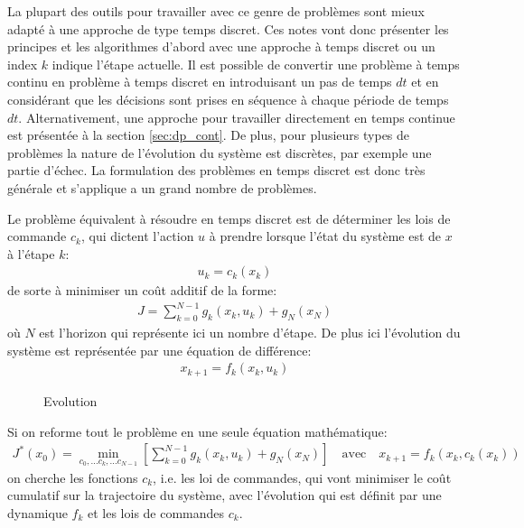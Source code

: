 La plupart des outils pour travailler avec ce genre de problèmes sont mieux adapté à une approche de type temps discret. Ces notes vont donc présenter les principes et les algorithmes d'abord avec une approche à temps discret ou un index $k$ indique l'étape actuelle. Il est possible de convertir une problème à temps continu en problème à temps discret en introduisant un pas de temps $dt$ et en considérant que les décisions sont prises en séquence à chaque période de temps $dt$. Alternativement, une approche pour travailler directement en temps continue est présentée à la section \ref{sec:dp_cont}. De plus, pour plusieurs types de problèmes la nature de l'évolution du système est discrètes, par exemple une partie d'échec. La formulation des problèmes en temps discret est donc très générale et s'applique a un grand nombre de problèmes.

Le problème équivalent à résoudre en temps discret est de déterminer les lois de commande $c_k$, qui dictent l'action $u$ à prendre lorsque l'état du système est de $x$ à l'étape $k$:
\begin{align}
u_k = c_k( x_k )
\end{align}
de sorte à minimiser un coût additif de la forme:
\begin{align}
    J = \sum_{k=0}^{N-1} g_k(x_k, u_k) + g_N( x_N )
\end{align}
où $N$ est l'horizon qui représente ici un nombre d'étape. De plus ici l'évolution du système est représentée par une équation de différence:
\begin{align}
    x_{k+1} = f_k( x_k, u_k)
\end{align}

\begin{figure}[H]
	\centering
	\vspace{-10pt}
		\caption{Evolution}
		\label{fig:evolution}
\end{figure}

Si on reforme tout le problème en une seule équation mathématique:
\begin{align}
    J^*(x_0) = \min_{c_0, ... c_k, ... c_{N-1}} 
    \left[ \sum_{k=0}^{N-1} g_k(x_k, u_k) + g_N( x_N )
    \right] \quad
    \text{avec} \quad
    x_{k+1} = f_k( x_k, c_k(x_k) )
\end{align}
on cherche les fonctions $c_k$, i.e. les loi de commandes, qui vont minimiser le coût cumulatif  sur la trajectoire du système, avec l'évolution qui est définit par une dynamique $f_k$ et les lois de commandes $c_k$.


